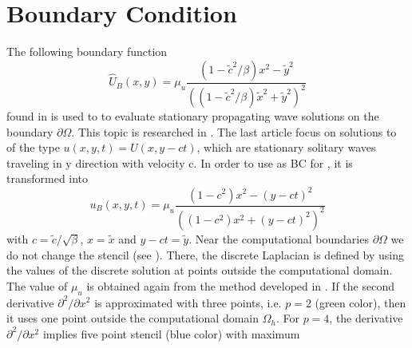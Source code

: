 \documentclass[11pt,a4paper,twoside]{article}
\begin{document}
\section{Boundary Condition}\label{BndS}
The following boundary function
\begin{equation}\label{eqBCV}
\widehat U_B(x , y) = \mu_u \frac{ (1 - \tilde c^2/\beta) x^2 - \tilde y^2}{( (1 - \tilde c^2/\beta) \tilde x^2 + \tilde y^2)^2}
\end{equation}
found in \cite{BoundaryProblem} is used to to evaluate stationary propagating wave solutions on the boundary $\partial \Omega$. This topic is researched in \cite{EllipticProblem}. The last article focus on solutions to  of the type $u(x, y, t) = U(x, y - ct)$, which are stationary solitary waves traveling in y direction
with velocity c. In order to use  as BC for , it is transformed into
\begin{equation}\label{eqBCH}
u_B(x, y, t) = \mu_u \frac{ (1 - c^2) x^2 - (y-ct)^2}{( (1 - c^2) x^2 + (y-ct)^2)^2}
\end{equation}
with $c = \tilde c / \sqrt{\beta}$, $x = \tilde x$ and $y - ct = \tilde y$. 
Near the computational boundaries $\partial \Omega$ we do not change the stencil  (see ). There, the discrete Laplacian
is defined by using the values of the discrete solution  at points outside the computational domain. The value of $\mu_u$ is obtained again from the method developed in \cite{BoundaryProblem}. If the second derivative $\partial^2 / \partial x^2$ is approximated with three points, i.e. $p=2$ (green color), then it uses one point outside the computational domain $\Omega_h$. For $p=4$, the derivative $\partial^2 / \partial x^2$ implies five point stencil (blue color) with maximum
\end{document}
